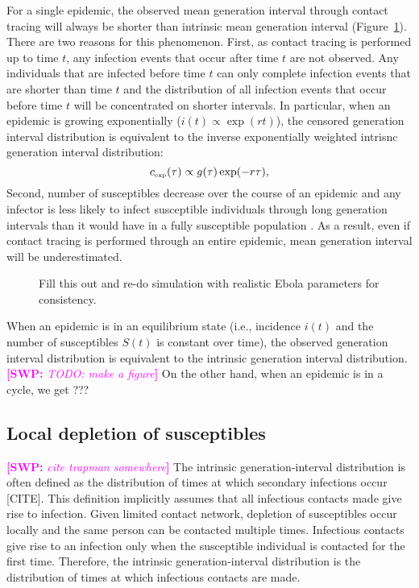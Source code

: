\documentclass{article}
\newcommand{\tsub}[2]{#1_{{\textrm{\tiny #2}}}}
\newcommand{\comment}[3]{\textcolor{#1}{\textbf{[#2: }\textsl{#3}\textbf{]}}}
\newcommand{\swp}[1]{\comment{magenta}{SWP}{#1}}
\begin{document}
For a single epidemic, the observed mean generation interval through contact tracing will always be shorter than intrinsic mean generation interval (Figure~\ref{fig:censor}).
There are two reasons for this phenomenon.
First, as contact tracing is performed up to time $t$, any infection events that occur after time $t$ are not observed.
Any individuals that are infected before time $t$ can only complete infection events that are shorter than time $t$ and the distribution of all infection events that occur before time $t$ will be concentrated on shorter intervals.
In particular, when an epidemic is growing exponentially ($i(t) \propto \exp(rt)$), the censored generation interval distribution is equivalent to the inverse exponentially weighted intrisnc generation interval distribution:
\begin{equation}
\tsub{c}{exp}(\tau) \propto g(\tau) \exp(-r\tau),
\end{equation}
Second, number of susceptibles decrease over the course of an epidemic and any infector is less likely to infect susceptible individuals through long generation intervals than it would have in a fully susceptible population \citep{champredon2015intrinsic}.
As a result, even if contact tracing is performed through an entire epidemic, mean generation interval will be underestimated.

\begin{figure}
\caption{Fill this out and re-do simulation with realistic Ebola parameters for consistency.}
\label{fig:censor}
\end{figure}

When an epidemic is in an equilibrium state (i.e., incidence $i(t)$ and the number of susceptibles $S(t)$ is constant over time), the observed generation interval distribution is equivalent to the intrinsic generation interval distribution. \swp{TODO: make a figure}
On the other hand, when an epidemic is in a cycle, we get ???

\subsection{Local depletion of susceptibles}

\swp{cite trapman somewhere}
The intrinsic generation-interval distribution is often defined as the distribution of times at which secondary infections occur [CITE].
This definition implicitly assumes that all infectious contacts made give rise to infection. 
Given limited contact network, depletion of susceptibles occur locally and the same person can be contacted multiple times.
Infectious contacts give rise to an infection only when the susceptible individual is contacted for the first time.
Therefore, the intrinsic generation-interval distribution is the distribution of times at which infectious contacts are made.
\end{document}
